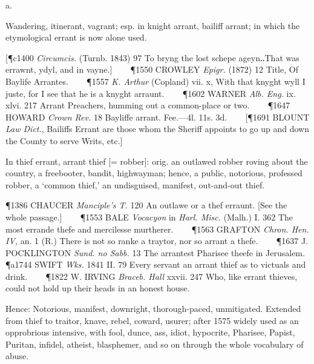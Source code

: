 \begin{description}[wide, labelwidth=!, labelindent=0pt]
 a.

\noindent {}

\noindent [A variant of errant, ‘wandering, vagrant, vagabond,’ which from its frequent use in such expressions as arrant thief, became an intensive, ‘thorough, notorious, downright,’ especially, from its original associations, with opprobrious names. For the vowel-change cf. arrand= errand, Harry=Herry, Henry, far=earlier fer, etc.]
\vspace{-0.3cm}

\begin{myenumerate}

 Wandering, itinerant, vagrant; esp. in knight arrant, bailiff arrant; in which the etymological errant is now alone used.

[\P c1400 \textit{Circumcis.} (Turnb. 1843) 97 To bryng the lost schepe ageyn‥That was errawnt, ydyl, and in vayne.]    
\P 1550 CROWLEY  \textit{Epigr.} (1872) 12 Title, Of Baylife Arrantes.    
\P 1557 \textit{K. Arthur} (Copland) vii. x, With that knyght wyll I juste, for I see that he is a knyght arraunt.    
\P 1602 WARNER  \textit{Alb. Eng.} ix. xlvi. 217 Arrant Preachers, humming out a common-place or two.    
\P 1647 HOWARD  \textit{Crown Rev.} 18 Bayliffe arrant. Fee.—4l. 11s. 3d.    
[\P 1691 BLOUNT  \textit{Law Dict.}, Bailiffs Errant are those whom the Sheriff appoints to go up and down the County to serve Writs, etc.]

 In thief errant, arrant thief [= robber]: orig. an outlawed robber roving about the country, a freebooter, bandit, highwayman; hence, a public, notorious, professed robber, a ‘common thief,’ an undisguised, manifest, out-and-out thief.

\P 1386 CHAUCER  \textit{Manciple's T.} 120 An outlawe or a thef erraunt. [See the whole passage.]    
\P 1553 BALE  \textit{Vocacyon} in \textit{Harl. Misc.} (Malh.) I. 362 The most errande thefe and mercilesse murtherer.    
\P 1563 GRAFTON  \textit{Chron. Hen. IV,} an. 1 (R.) There is not so ranke a traytor, nor so arrant a thefe.    
\P 1637 J. POCKLINGTON  \textit{Sund. no Sabb.} 13 The arrantest Pharisee theefe in Jerusalem.
\P a1744 SWIFT \textit{Wks.} 1841 II. 79 Every servant an arrant thief as to victuals and drink.    
\P 1822 W. IRVING  \textit{Braceb. Hall} xxvii. 247 Who, like errant thieves, could not hold up their heads in an honest house.

 Hence: Notorious, manifest, downright, thorough-paced, unmitigated. Extended
from thief to traitor, knave, rebel, coward, usurer; after 
1575 widely used as an opprobrious intensive, with fool, dunce, ass, idiot, hypocrite, Pharisee, Papist, Puritan, infidel, atheist, blasphemer, and so on through the whole vocabulary of abuse.


\end{myenumerate}
\end{description}

